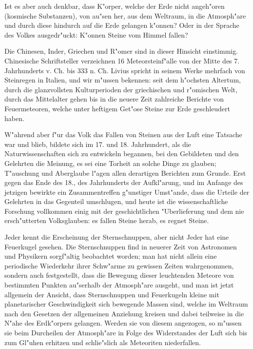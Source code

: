 \documentclass[a4paper, 11pt, oneside]{article}
\begin{document}
Ist es aber auch denkbar, dass K"orper, welche der Erde nicht angeh"oren (kosmische Substanzen), von au"sen her, aus dem Weltraum, in die Atmosph"are und durch diese hindurch auf die Erde gelangen k"onnen? Oder in der Sprache des Volkes ausgedr"uckt: K"onnen Steine vom Himmel fallen?

Die Chinesen, Inder, Griechen und R"omer sind in dieser Hinsicht einstimmig. Chinesische Schriftsteller verzeichnen 16 Meteorsteinf"alle von der Mitte des 7. Jahrhunderts v. Ch. bis 333 n. Ch. Livius spricht in seinem Werke mehrfach von Steinregen in Italien, und wir m"ussen bekennen: seit dem h"ochsten Altertum, durch die glanzvollsten Kulturperioden der griechischen und r"omischen Welt, durch das Mittelalter gehen bis in die neuere Zeit zahlreiche Berichte von Feuermeteoren, welche unter heftigem Get"ose Steine zur Erde geschleudert haben.

W"ahrend aber f"ur das Volk das Fallen von Steinen aus der Luft eine Tatsache war und blieb, bildete sich im 17. und 18. Jahrhundert, als die Naturwissenschaften sich zu entwickeln begannen, bei den Gebildeten und den Gelehrten die Meinung, es sei eine Torheit an solche Dinge zu glauben; T"auschung und Aberglaube l"agen allen derartigen Berichten zum Grunde. Erst gegen das Ende des 18., des Jahrhunderts der Aufkl"arung, und im Anfange des jetzigen bewirkte ein Zusammentreffen g"unstiger Umst"ande, dass die Urteile der Gelehrten in das Gegenteil umschlugen, und heute ist die wissenschaftliche Forschung vollkommen einig mit der geschichtlichen "Uberlieferung und dem nie ersch"utterten Volksglauben: es fallen Steine herab, es regnet Steine.

Jeder kennt die Erscheinung der Sternschnuppen, aber nicht Jeder hat eine Feuerkugel gesehen. Die Sternschnuppen find in neuerer Zeit von Astronomen und Physikern sorgf"altig beobachtet worden; man hat nicht allein eine periodische Wiederkehr ihrer Schw"arme zu gewissen Zeiten wahrgenommen, sondern auch festgestellt, dass die Bewegung dieser leuchtenden Meteore von bestimmten Punkten au"serhalb der Atmosph"are ausgeht, und man ist jetzt allgemein der Ansicht, dass Sternschnuppen und Feuerkugeln kleine mit planetarischer Geschwindigkeit sich bewegende Massen sind, welche im Weltraum nach den Gesetzen der allgemeinen Anziehung kreisen und dabei teilweise in die N"ahe des Erdk"orpers gelangen. Werden sie von diesem angezogen, so m"ussen sie beim Durcheilen der Atmosph"are in Folge des Widerstandes der Luft sich bis zum Gl"uhen erhitzen und schlie"slich als Meteoriten niederfallen.
\end{document}
